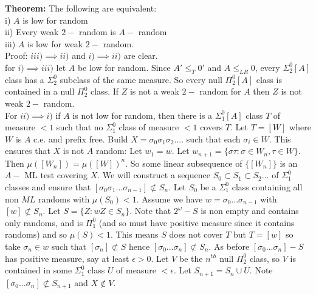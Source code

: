 \documentclass{article}
\begin{document}
      \textbf{Theorem:} The following are equivalent:\\
      i) $A$ is low for random\\
      ii) Every weak $2-$ random is $A-$ random\\
      iii) $A$ is low for weak $2-$ random.\\
      Proof: $iii) \implies ii)$ and $i) \implies ii)$ are clear. \\
      for $i)\implies iii)$ let $A$ be low for random. Since $A' \leq_T 0'$ and $A \leq_{LR}0$, every  $\Sigma^0_2[A]$ class has a $\Sigma^0_2$ subclass of the same measure. So every null $\Pi^0_2[A]$ class is contained in a null $\Pi^0_2$ class. If $Z$ is not a weak $2-$ random for $A$ then $Z$ is not weak $2-$ random.\\
      For $ii) \implies i)$ if $A$ is not low for random, then there is a $\Sigma^0_1[A]$ class $T$ of measure $< 1$ such that no $\Sigma^0_1$ class of measure $<1$ covers $T$. Let $T = [W]$ where $W$ is $A$ c.e. and prefix free. Build $X = \sigma_0\sigma_1\sigma_2....$ such that each $\sigma_i \in W$. This ensures that $X$ is not $A$ random: Let $w_1 = w$. Let $w_{n+1} = \{\sigma \tau: \sigma \in W_n, \tau \in W\}$. Then $\mu([W_n]) = \mu([W])^n$. So some linear subsequence of $\{[W_n]\}$ is an $A-$ ML test covering $X$. We will construct a sequence $S_0 \subset S_1 \subset S_2...$ of $\Sigma^0_1$ classes and ensure that $[\sigma_0 \sigma_1...\sigma_{n-1}] \not \subset S_n$. Let $S_0$ be a $\Sigma^0_1$ class containing all non $ML$ randoms with $\mu(S_0)< 1$. Assume we have $w = \sigma_0 ... \sigma_{n-1}$ with $[w] \not \subset S_n$. Let $S = \{Z  : wZ \in S_n\}$. Note that $2^\omega -S$ is non empty and contains only randoms, and is $\Pi^0_1$ (and so must have positive measure since it contains randoms) and so $\mu(S) < 1$.
      This means $S$ does not cover $T$ but $T = [w]$ so take $\sigma_n \in w$ such that $[\sigma_n] \not \subset S$ hence $[\sigma_0 ... \sigma_n] \not \subset S_n$. As before $[\sigma_0 ... \sigma_n] - S$ has positive measure, say at least $\epsilon > 0$. Let $V$ be the $n^{th}$ null $\Pi^0_2$ class, so $V$ is contained in some $\Sigma^0_1$ class $U$ of measure $< \epsilon$. Let $S_{n+1}= S_n \cup U$. Note $[\sigma_0...\sigma_n] \not \subset S_{n+1}$ and $X \not \in V$. 
\end{document}
